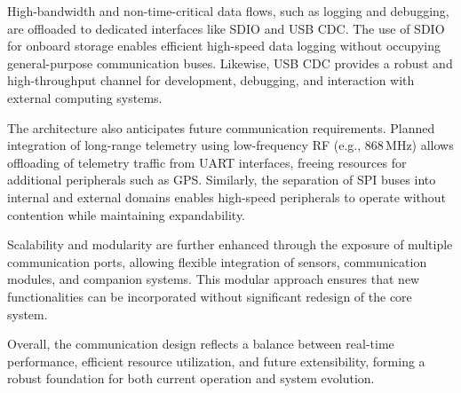 High-bandwidth and non-time-critical data flows, such as logging and debugging, are offloaded to dedicated interfaces like SDIO and USB CDC. The use of SDIO for onboard storage enables efficient high-speed data logging without occupying general-purpose communication buses. Likewise, USB CDC provides a robust and high-throughput channel for development, debugging, and interaction with external computing systems.

The architecture also anticipates future communication requirements. Planned integration of long-range telemetry using low-frequency RF (e.g., 868\,MHz) allows offloading of telemetry traffic from UART interfaces, freeing resources for additional peripherals such as GPS. Similarly, the separation of SPI buses into internal and external domains enables high-speed peripherals to operate without contention while maintaining expandability.

Scalability and modularity are further enhanced through the exposure of multiple communication ports, allowing flexible integration of sensors, communication modules, and companion systems. This modular approach ensures that new functionalities can be incorporated without significant redesign of the core system.

Overall, the communication design reflects a balance between real-time performance, efficient resource utilization, and future extensibility, forming a robust foundation for both current operation and system evolution.

